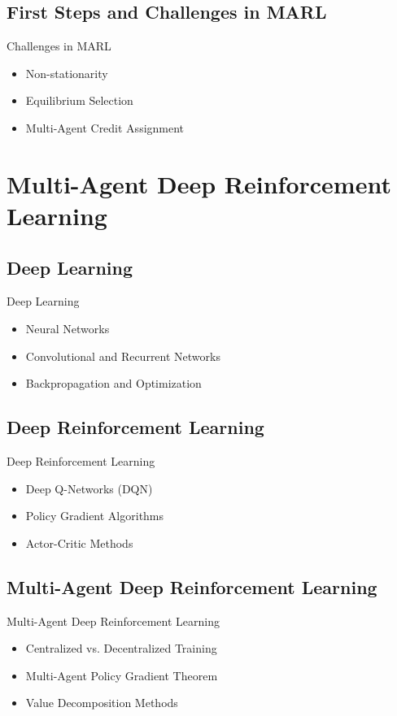 \documentclass{beamer}
\begin{document}
\subsection{First Steps and Challenges in MARL}
\begin{frame}{Challenges in MARL}
  \begin{itemize}
    \item Non-stationarity
    \item Equilibrium Selection
    \item Multi-Agent Credit Assignment
  \end{itemize}
\end{frame}

\section{Multi-Agent Deep Reinforcement Learning}

\subsection{Deep Learning}
\begin{frame}{Deep Learning}
  \begin{itemize}
    \item Neural Networks
    \item Convolutional and Recurrent Networks
    \item Backpropagation and Optimization
  \end{itemize}
\end{frame}

\subsection{Deep Reinforcement Learning}
\begin{frame}{Deep Reinforcement Learning}
  \begin{itemize}
    \item Deep Q-Networks (DQN)
    \item Policy Gradient Algorithms
    \item Actor-Critic Methods
  \end{itemize}
\end{frame}

\subsection{Multi-Agent Deep Reinforcement Learning}
\begin{frame}{Multi-Agent Deep Reinforcement Learning}
  \begin{itemize}
    \item Centralized vs. Decentralized Training
    \item Multi-Agent Policy Gradient Theorem
    \item Value Decomposition Methods
  \end{itemize}
\end{frame}
\end{document}
